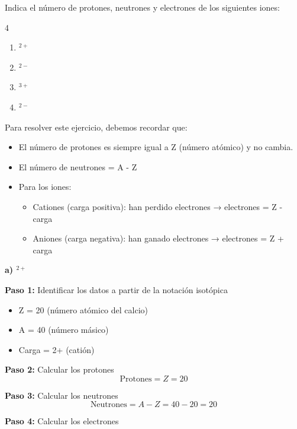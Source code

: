 \begin{exercise}
    Indica el número de protones, neutrones y electrones de los siguientes iones:
    \begin{multicols}{4}
        \begin{enumerate}[label=\letraminuscula]
        \item {}$^{2+}$
        \item {}$^{2-}$
        \item {}$^{3+}$
        \item {}$^{2-}$
        \end{enumerate}
    \end{multicols}
    \begin{solu}
        Para resolver este ejercicio, debemos recordar que:
        \begin{itemize}
            \item El número de protones es siempre igual a Z (número atómico) y no cambia.
            \item El número de neutrones = A - Z
            \item Para los iones:
            \begin{itemize}
                \item Cationes (carga positiva): han perdido electrones → electrones = Z - carga
                \item Aniones (carga negativa): han ganado electrones → electrones = Z + carga
            \end{itemize}
        \end{itemize}

        \textbf{a) $^{2+}$}

        \textbf{Paso 1:} Identificar los datos a partir de la notación isotópica
        \begin{itemize}
            \item Z = 20 (número atómico del calcio)
            \item A = 40 (número másico)
            \item Carga = 2+ (catión)
        \end{itemize}

        \textbf{Paso 2:} Calcular los protones
        \[
            \text{Protones} = Z = 20
        \]

        \textbf{Paso 3:} Calcular los neutrones
        \[
            \text{Neutrones} = A - Z = 40 - 20 = 20
        \]

        \textbf{Paso 4:} Calcular los electrones


\end{solu}
\end{exercise}

